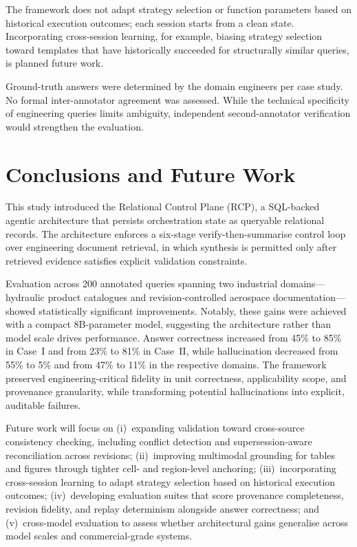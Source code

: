 \documentclass[largeformat]{interact}
\begin{document}
\begin{description}[style=unboxed, leftmargin=0pt, labelindent=0pt, font=\itshape]
\item[Cross-session learning.]
The framework does not adapt strategy selection or function parameters based on historical execution outcomes; each session starts from a clean state. Incorporating cross-session learning, for example, biasing strategy selection toward templates that have historically succeeded for structurally similar queries, is planned future work.
 
\item[Annotation protocol.]
Ground-truth answers were determined by the domain engineers per case study. No formal inter-annotator agreement was assessed. While the technical specificity of engineering queries limits ambiguity, independent second-annotator verification would strengthen the evaluation.
 
\end{description}


\section{Conclusions and Future Work}
\label{sec:conclusions_and_future_work}
This study introduced the Relational Control Plane (RCP), a SQL-backed agentic architecture that persists orchestration state as queryable relational records. The architecture enforces a six-stage verify-then-summarise control loop over engineering document retrieval, in which synthesis is permitted only after retrieved evidence satisfies explicit validation constraints.
 
Evaluation across 200 annotated queries spanning two industrial domains---hydraulic product catalogues and revision-controlled aerospace documentation---showed statistically significant improvements. Notably, these gains were achieved with a compact 8B-parameter model, suggesting the architecture rather than model scale drives performance. Answer correctness increased from 45\% to 85\% in Case~I and from 23\% to 81\% in Case~II, while hallucination decreased from 55\% to 5\% and from 47\% to 11\% in the respective domains. The framework preserved engineering-critical fidelity in unit correctness, applicability scope, and provenance granularity, while transforming potential hallucinations into explicit, auditable failures.
 
Future work will focus on (i)~expanding validation toward cross-source consistency checking, including conflict detection and supersession-aware reconciliation across revisions; (ii)~improving multimodal grounding for tables and figures through tighter cell- and region-level anchoring; (iii)~incorporating cross-session learning to adapt strategy selection based on historical execution outcomes; (iv)~developing evaluation suites that score provenance completeness, revision fidelity, and replay determinism alongside answer correctness; and (v)~cross-model evaluation to assess whether architectural gains generalise across model scales and commercial-grade systems.
 
\end{document}
